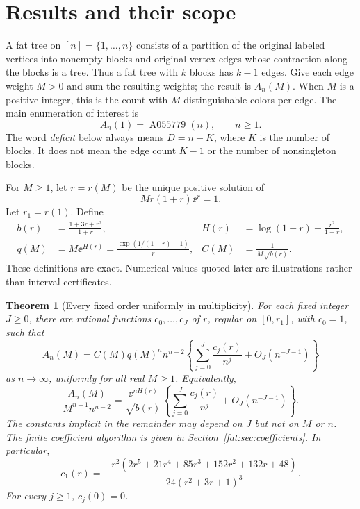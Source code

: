 \documentclass[11pt,letterpaper]{article}
\numberwithin{equation}{section}
\newtheorem{theorem}{Theorem}[section]
\theoremstyle{remark}\newtheorem{remark}[theorem]{Remark}
\begin{document}
\section{Results and their scope}\label{fat:sec:results}
A fat tree on $[n]=\{1,\ldots,n\}$ consists of a partition of the original labeled vertices into nonempty blocks and original-vertex edges whose contraction along the blocks is a tree. Thus a fat tree with $k$ blocks has $k-1$ edges. Give each edge weight $M>0$ and sum the resulting weights; the result is $A_n(M)$. When $M$ is a positive integer, this is the count with $M$ distinguishable colors per edge. The main enumeration of interest is \cite{oeis55779}
\[
 A_n(1)=\operatorname{A055779}(n),\qquad n\ge1.
\]
The word \emph{deficit} below always means $D=n-K$, where $K$ is the number of blocks. It does not mean the edge count $K-1$ or the number of nonsingleton blocks.

For $M\ge1$, let $r=r(M)$ be the unique positive solution of
\begin{equation}\label{fat:eq:saddle}
 Mr(1+r)\ee^r=1.
\end{equation}
Let $r_1=r(1)$. Define
\begin{align}
 b(r)&=\frac{1+3r+r^2}{1+r},& H(r)&=\log(1+r)+\frac{r^2}{1+r},\label{fat:eq:bH}\\
 q(M)&=M\ee^{H(r)}=\frac{\exp(1/(1+r)-1)}r,&
 C(M)&=\frac1{M\sqrt{b(r)}}.\label{fat:eq:qC}
\end{align}
These definitions are exact. Numerical values quoted later are illustrations rather than interval certificates.

\begin{theorem}[Every fixed order uniformly in multiplicity]\label{fat:thm:main}
For each fixed integer $J\ge0$, there are rational functions $c_0,\ldots,c_J$ of $r$, regular on $[0,r_1]$, with $c_0=1$, such that
\begin{equation}\label{fat:eq:main}
 A_n(M)=C(M)q(M)^n n^{n-2}
 \left\{\sum_{j=0}^{J}\frac{c_j(r)}{n^j}+O_J(n^{-J-1})\right\}
\end{equation}
as $n\to\infty$, uniformly for all real $M\ge1$. Equivalently,
\begin{equation}\label{fat:eq:normalized}
 \frac{A_n(M)}{M^{n-1}n^{n-2}}
 =\frac{\ee^{nH(r)}}{\sqrt{b(r)}}
 \left\{\sum_{j=0}^{J}\frac{c_j(r)}{n^j}+O_J(n^{-J-1})\right\}.
\end{equation}
The constants implicit in the remainder may depend on $J$ but not on $M$ or $n$. The finite coefficient algorithm is given in Section~\ref{fat:sec:coefficients}. In particular,
\begin{equation}\label{fat:eq:c1}
 c_1(r)=-\frac{r^2(2r^5+21r^4+85r^3+152r^2+132r+48)}
 {24(r^2+3r+1)^3}.
\end{equation}
For every $j\ge1$, $c_j(0)=0$.
\end{theorem}
\end{document}
